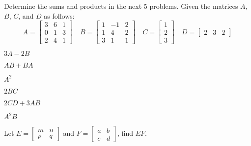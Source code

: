 Determine the sums and products in the next 5 problems. Given the matrices \( A \), \( B \), \( C \), and \( D \) as follows:
\[
    A =
    \begin{bmatrix}
        3 & 6 & 1 \\
        0 & 1 & 3 \\
        2 & 4 & 1
    \end{bmatrix}
    \quad
    B =
    \begin{bmatrix}
        1 & -1 & 2 \\
        1 & 4  & 2 \\
        3 & 1  & 1
    \end{bmatrix}
    \quad
    C =
    \begin{bmatrix}
        1 \\
        2 \\
        3
    \end{bmatrix}
    \quad
    D =
    \begin{bmatrix}
        2 & 3 & 2
    \end{bmatrix}
\]

\begin{puzzle}
    $3A - 2B$
\end{puzzle}

\begin{puzzle}
    $AB + BA$
\end{puzzle}

\begin{puzzle}
    $A^2$
\end{puzzle}

\begin{puzzle}
    $2BC$
\end{puzzle}

\begin{puzzle}
    $2CD + 3AB$
\end{puzzle}

\begin{puzzle}
    $A^2B$
\end{puzzle}

\begin{puzzle}
    Let \( E = \begin{bmatrix} m & n \\ p & q \end{bmatrix} \) and \( F = \begin{bmatrix} a & b \\ c & d \end{bmatrix} \), find $EF$.
\end{puzzle}

